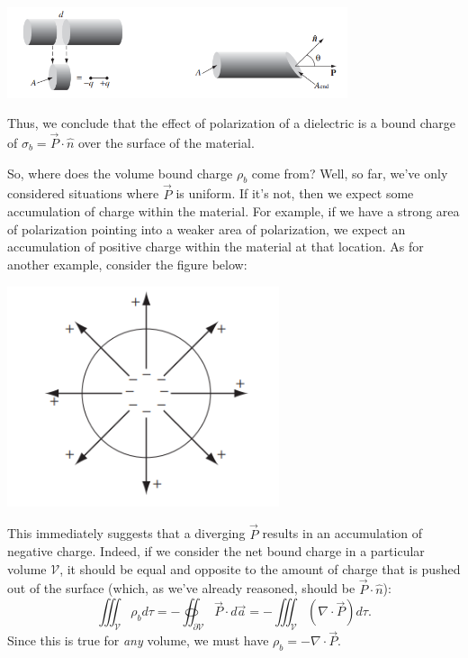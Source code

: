 \begin{center}
    \includegraphics[width=10cm]{Electrodynamics/images/fig4.12-13.PNG}
\end{center}

Thus, we conclude that the effect of polarization of a dielectric is a bound charge of $\sigma_b=\vec{P}\cdot\hat{n}$ over the surface of the material.

So, where does the volume bound charge $\rho_b$ come from? Well, so far, we've only considered situations where $\vec{P}$ is uniform. If it's not, then we expect some accumulation of charge within the material. For example, if we have a strong area of polarization pointing into a weaker area of polarization, we expect an accumulation of positive charge within the material at that location. As for another example, consider the figure below:

\begin{center}
    \includegraphics[width=8cm]{Electrodynamics/images/fig4.14.PNG}
\end{center}

This immediately suggests that a diverging $\vec{P}$ results in an accumulation of negative charge. Indeed, if we consider the net bound charge in a particular volume $\mathcal{V}$, it should be equal and opposite to the amount of charge that is pushed out of the surface (which, as we've already reasoned, should be $\vec{P}\cdot\hat{n}$):
\[\iiint_{\mathcal{V}}\rho_bd\tau=-\oiint_{\partial\mathcal{V}}\vec{P}\cdot d\vec{a}=-\iiint_{\mathcal{V}}(\nabla\cdot \vec{P})d\tau.\]
Since this is true for \textit{any} volume, we must have $\rho_b=-\nabla\cdot \vec{P}$.

